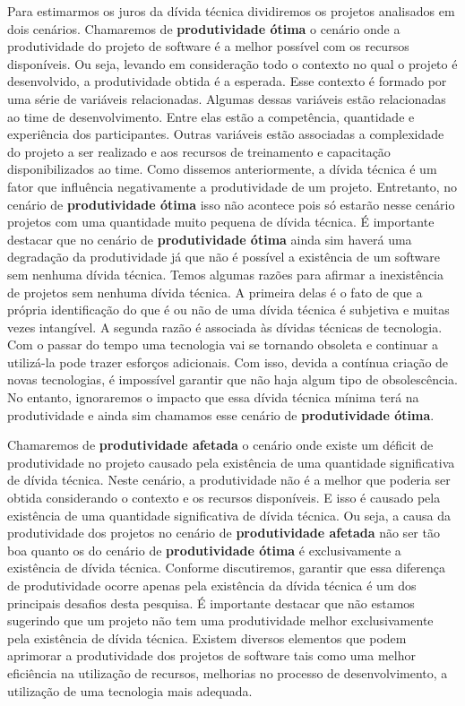 Para estimarmos os juros da dívida técnica dividiremos os projetos analisados em dois cenários. Chamaremos de \textbf{produtividade ótima} o cenário onde a produtividade do projeto  de software é a melhor possível com os recursos disponíveis. Ou seja, levando em consideração todo o contexto no qual o projeto é desenvolvido, a produtividade obtida é a esperada. Esse contexto é formado por uma série de variáveis relacionadas.  Algumas dessas variáveis estão relacionadas ao time de desenvolvimento. Entre elas estão a competência, quantidade e experiência dos participantes. Outras variáveis estão associadas a complexidade do projeto a ser realizado e aos recursos de treinamento e capacitação disponibilizados ao time. Como dissemos anteriormente, a dívida técnica é um fator que influência negativamente a produtividade de um projeto. Entretanto,  no cenário de \textbf{produtividade ótima} isso não acontece pois só estarão nesse cenário projetos com uma quantidade muito pequena de dívida técnica.  É importante destacar que no cenário  de \textbf{produtividade ótima} ainda sim haverá uma degradação da produtividade já que não é possível a existência de um software sem nenhuma dívida técnica. Temos algumas razões para afirmar a inexistência de projetos sem nenhuma dívida técnica. A primeira delas é o fato de que a própria identificação do que é ou não de uma dívida técnica é subjetiva e muitas vezes intangível. A segunda razão é associada às dívidas técnicas de tecnologia. Com o passar do tempo uma tecnologia vai se tornando obsoleta e continuar a utilizá-la pode trazer esforços adicionais. Com isso, devida a contínua criação de novas tecnologias, é impossível garantir que não haja algum tipo de obsolescência. No entanto, ignoraremos o impacto que essa dívida técnica mínima terá na produtividade e ainda sim chamamos esse cenário de \textbf{produtividade ótima}.




Chamaremos de \textbf{produtividade afetada} o cenário onde existe um déficit de produtividade no projeto causado pela existência de uma quantidade significativa de dívida técnica. Neste cenário, a produtividade não é a melhor que poderia ser obtida considerando o contexto e os recursos disponíveis. E isso é causado pela existência de uma quantidade significativa de dívida técnica. Ou seja, a causa da  produtividade dos projetos  no cenário de \textbf{produtividade afetada} não ser tão boa quanto os do cenário de  \textbf{produtividade ótima} é exclusivamente a existência de dívida técnica.  Conforme discutiremos, garantir que essa diferença de produtividade ocorre apenas pela existência da dívida técnica é um dos principais desafios desta pesquisa. É importante destacar que não estamos sugerindo que um projeto não tem uma produtividade melhor exclusivamente pela existência de dívida técnica. Existem diversos elementos que podem aprimorar a produtividade dos projetos de software tais como uma melhor eficiência na utilização de recursos, melhorias no processo de desenvolvimento, a utilização de uma tecnologia mais adequada. 


